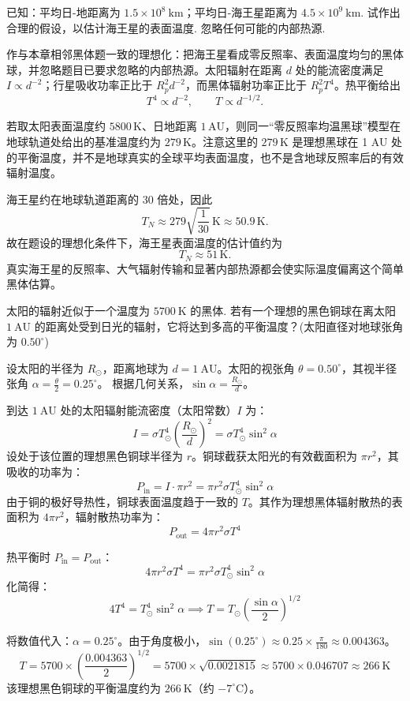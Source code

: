 \begin{exercise}\label{ex:13.11}
已知：平均日-地距离为 $1.5 \times 10^8 \ \mathrm{km}$；平均日-海王星距离为 $4.5 \times 10^9 \ \mathrm{km}$. 试作出合理的假设，以估计海王星的表面温度. 忽略任何可能的内部热源.
\end{exercise}
\begin{solution}
作与本章相邻黑体题一致的理想化：把海王星看成零反照率、表面温度均匀的黑体球，并忽略题目已要求忽略的内部热源。太阳辐射在距离 $d$ 处的能流密度满足 $I\propto d^{-2}$；行星吸收功率正比于 $R_p^2d^{-2}$，而黑体辐射功率正比于 $R_p^2T^4$。热平衡给出
$$ T^4\propto d^{-2},\qquad T\propto d^{-1/2}. $$

若取太阳表面温度约 $5800\,\mathrm K$、日地距离 $1\,\mathrm{AU}$，则同一“零反照率均温黑球”模型在地球轨道处给出的基准温度约为 $279\,\mathrm K$。注意这里的 $279\,\mathrm K$ 是理想黑球在 1 AU 处的平衡温度，并不是地球真实的全球平均表面温度，也不是含地球反照率后的有效辐射温度。

海王星约在地球轨道距离的 30 倍处，因此
$$
T_N\approx279\sqrt{\frac{1}{30}}\,\mathrm K
   \approx50.9\,\mathrm K.
$$
故在题设的理想化条件下，海王星表面温度的估计值约为
$$ \boxed{T_N\approx51\,\mathrm K}. $$
真实海王星的反照率、大气辐射传输和显著内部热源都会使实际温度偏离这个简单黑体估算。
\end{solution}

\begin{exercise}\label{ex:13.12}
太阳的辐射近似于一个温度为 $5700 \ \mathrm{K}$ 的黑体. 若有一个理想的黑色铜球在离太阳 $1 \ \mathrm{AU}$ 的距离处受到日光的辐射，它将达到多高的平衡温度？(太阳直径对地球张角为 $0.50^\circ$)
\end{exercise}
\begin{solution}
设太阳的半径为 $R_\odot$，距离地球为 $d = 1 \ \mathrm{AU}$。太阳的视张角 $\theta = 0.50^\circ$，其视半径张角 $\alpha = \frac{\theta}{2} = 0.25^\circ$。
根据几何关系，$\sin\alpha = \frac{R_\odot}{d}$。

到达 $1 \ \mathrm{AU}$ 处的太阳辐射能流密度（太阳常数）$I$ 为：
$$ I = \sigma T_\odot^4 \left(\frac{R_\odot}{d}\right)^2 = \sigma T_\odot^4 \sin^2\alpha $$
设处于该位置的理想黑色铜球半径为 $r$。铜球截获太阳光的有效截面积为 $\pi r^2$，其吸收的功率为：
$$ P_{\mathrm{in}} = I \cdot \pi r^2 = \pi r^2 \sigma T_\odot^4 \sin^2\alpha $$
由于铜的极好导热性，铜球表面温度趋于一致的 $T$。其作为理想黑体辐射散热的表面积为 $4\pi r^2$，辐射散热功率为：
$$ P_{\mathrm{out}} = 4\pi r^2 \sigma T^4 $$

热平衡时 $P_{\mathrm{in}} = P_{\mathrm{out}}$：
$$ 4\pi r^2 \sigma T^4 = \pi r^2 \sigma T_\odot^4 \sin^2\alpha $$
化简得：
$$ 4 T^4 = T_\odot^4 \sin^2\alpha \implies T = T_\odot \left( \frac{\sin\alpha}{2} \right)^{1/2} $$

将数值代入：$\alpha = 0.25^\circ$。由于角度极小，$\sin(0.25^\circ) \approx 0.25 \times \frac{\pi}{180} \approx 0.004363$。
$$ T = 5700 \times \left( \frac{0.004363}{2} \right)^{1/2} = 5700 \times \sqrt{0.0021815} \approx 5700 \times 0.046707 \approx 266 \ \mathrm{K} $$
该理想黑色铜球的平衡温度约为 $266 \ \mathrm{K}$（约 $-7^\circ\mathrm{C}$）。
\end{solution}

